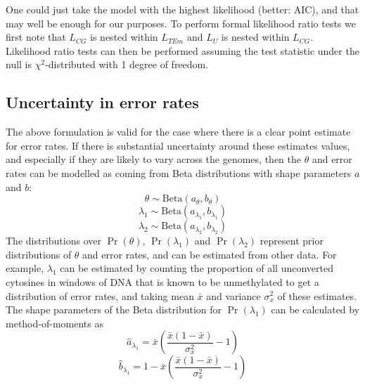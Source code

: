 \documentclass[12pt,longbibliography]{article}
\begin{document}
One could just take the model with the highest likelihood (better: AIC), and that may well be enough for our purposes. To perform formal likelihood ratio tests we first note that $L_{CG}$ is nested within $L_{TEm}$ and $L_{U}$ is nested within $L_{CG}$. Likelihood ratio tests can then be performed assuming the test statistic under the null is $\chi^2$-distributed 
with 1 degree of freedom.

\subsection{Uncertainty in error rates}

The above formulation is valid for the case where there is a clear point estimate for error rates.
If there is substantial uncertainty around these estimates values, and especially if they are likely to vary across the genomes, then the $\theta$ and error rates can be modelled as coming from Beta distributions with shape parameters $a$ and $b$:
\begin{equation}
    \theta \sim \textrm{Beta}(a_{\theta}, b_{\theta})
\end{equation}
\begin{equation}
    \lambda_1 \sim \textrm{Beta}(a_{\lambda_1}, b_{\lambda_1})
\end{equation}
\begin{equation}
    \lambda_2 \sim \textrm{Beta}(a_{\lambda_2}, b_{\lambda_2})
\end{equation}
The distributions over $\Pr(\theta)$, $\Pr(\lambda_1)$ and $\Pr(\lambda_2)$ represent prior distributions of $\theta$ and error rates, and can be estimated from other data.
For example, $\lambda_1$ can be estimated by counting the proportion of all unconverted cytosines in windows of DNA that is known to be unmethylated to get a distribution of error rates, and taking mean $\bar{x}$ and variance $\sigma^2_x$ of these estimates.
The shape parameters of the Beta distribution for $\Pr(\lambda_1)$ can be calculated by method-of-moments as
\begin{equation}
    \hat{a}_{\lambda_1} = \bar{x}(\frac{\bar{x}(1-\bar{x})}{\sigma^2_x}-1)
\end{equation}
\begin{equation}
    \hat{b}_{\lambda_1} = 1-\bar{x}(\frac{\bar{x}(1-\bar{x})}{\sigma^2_x}-1) 
\end{equation}
\end{document}
